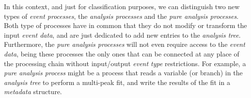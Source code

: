
In this context, and just for classification purposes, we can distinguish two new types of \emph{event processes}, the \emph{analysis processes} and the \emph{pure analysis processes}. Both type of processes have in common that they do not modify or transform the input \emph{event data}, and are just dedicated to add new entries to the \emph{analysis tree}. Furthermore, the \emph{pure analysis processes} will not even require access to the \emph{event data}, being these processes the only ones that can be connected at any place of the processing chain without input/output \emph{event type} restrictions. For example, a \emph{pure analysis process} might be a process that reads a variable (or branch) in the \emph{analysis tree} to perform a multi-peak fit, and write the results of the fit in a \emph{metadata} structure.

